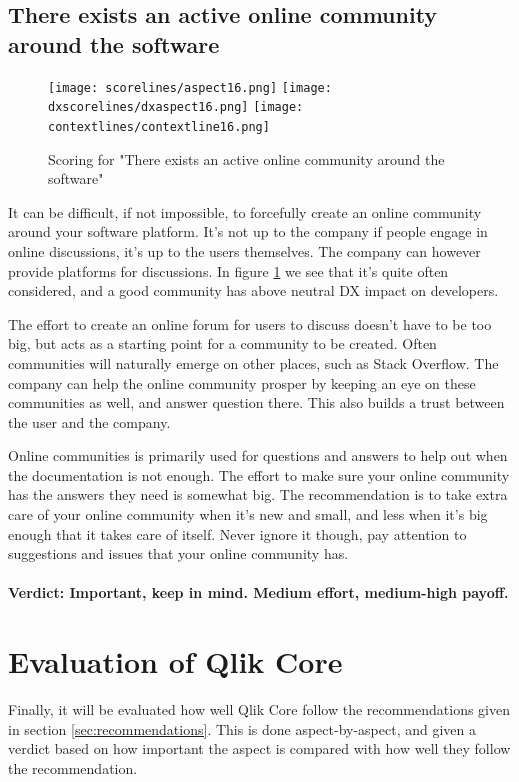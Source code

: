 \documentclass{cslthse-msc}
\begin{document}
    \subsection{There exists an active online community around the software}
    \begin{figure}[H]
        \centering
        \texttt{[image: scorelines/aspect16.png]}
        \texttt{[image: dxscorelines/dxaspect16.png]}
        \texttt{[image: contextlines/contextline16.png]}
        \caption{Scoring for "There exists an active online community around the software"}
        \label{fig:aspect16}
    \end{figure}
    It can be difficult, if not impossible, to forcefully create an online community around your software platform. It's not up to the company if people engage in online discussions, it's up to the users themselves. The company can however provide platforms for discussions. In figure \ref{fig:aspect16} we see that it's quite often considered, and a good community has above neutral DX impact on developers.

    The effort to create an online forum for users to discuss doesn't have to be too big, but acts as a starting point for a community to be created. Often communities will naturally emerge on other places, such as Stack Overflow. The company can help the online community prosper by keeping an eye on these communities as well, and answer question there. This also builds a trust between the user and the company.

    Online communities is primarily used for questions and answers to help out when the documentation is not enough. The effort to make sure your online community has the answers they need is somewhat big. The recommendation is to take extra care of your online community when it's new and small, and less when it's big enough that it takes care of itself. Never ignore it though, pay attention to suggestions and issues that your online community has. \\ \\
    \textbf{Verdict: Important, keep in mind. Medium effort, medium-high payoff.}
    \section{Evaluation of Qlik Core}
    Finally, it will be evaluated how well Qlik Core follow the recommendations given in section \ref{sec:recommendations}. This is done aspect-by-aspect, and given a verdict based on how important the aspect is compared with how well they follow the recommendation.
\end{document}

